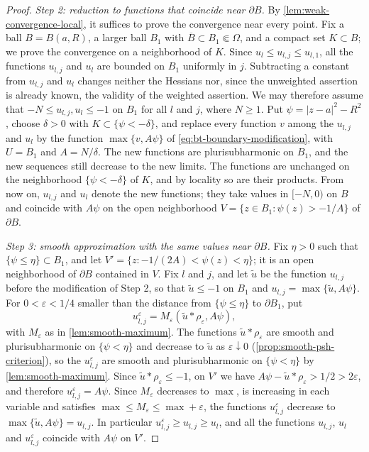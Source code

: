 \begin{proof}
\emph{Step 2: reduction to functions that coincide near $\partial B$.} By \cref{lem:weak-convergence-local}, it suffices to prove the convergence near every point. Fix a ball $B=B(a,R)$, a larger ball $B_1$ with $\overline B\subset B_1\Subset\Omega$, and a compact set $K\subset B$; we prove the convergence on a neighborhood of $K$. Since $u_l\le u_{l,j}\le u_{l,1}$, all the functions $u_{l,j}$ and $u_l$ are bounded on $B_1$ uniformly in $j$. Subtracting a constant from $u_{l,j}$ and $u_l$ changes neither the Hessians nor, since the unweighted assertion is already known, the validity of the weighted assertion. We may therefore assume that $-N\le u_{l,j},u_l\le-1$ on $B_1$ for all $l$ and $j$, where $N\ge1$. Put $\psi=|z-a|^2-R^2$, choose $\delta>0$ with $K\subset\{\psi<-\delta\}$, and replace every function $v$ among the $u_{l,j}$ and $u_l$ by the function $\max\{v,A\psi\}$ of \eqref{eq:bt-boundary-modification}, with $U=B_1$ and $A=N/\delta$. The new functions are plurisubharmonic on $B_1$, and the new sequences still decrease to the new limits. The functions are unchanged on the neighborhood $\{\psi<-\delta\}$ of $K$, and by locality so are their products. From now on, $u_{l,j}$ and $u_l$ denote the new functions; they take values in $[-N,0)$ on $B$ and coincide with $A\psi$ on the open neighborhood $V=\{z\in B_1:\psi(z)>-1/A\}$ of $\partial B$.

\emph{Step 3: smooth approximation with the same values near $\partial B$.} Fix $\eta>0$ such that $\{\psi\le\eta\}\subset B_1$, and let $V'=\{z:-1/(2A)<\psi(z)<\eta\}$; it is an open neighborhood of $\partial B$ contained in $V$. Fix $l$ and $j$, and let $\tilde u$ be the function $u_{l,j}$ before the modification of Step 2, so that $\tilde u\le-1$ on $B_1$ and $u_{l,j}=\max\{\tilde u,A\psi\}$. For $0<\varepsilon<1/4$ smaller than the distance from $\{\psi\le\eta\}$ to $\partial B_1$, put
\[
 u^\varepsilon_{l,j}=M_\varepsilon(\tilde u*\rho_\varepsilon,A\psi),
\]
with $M_\varepsilon$ as in \cref{lem:smooth-maximum}. The functions $\tilde u*\rho_\varepsilon$ are smooth and plurisubharmonic on $\{\psi<\eta\}$ and decrease to $\tilde u$ as $\varepsilon\downarrow0$ (\cref{prop:smooth-psh-criterion}), so the $u^\varepsilon_{l,j}$ are smooth and plurisubharmonic on $\{\psi<\eta\}$ by \cref{lem:smooth-maximum}. Since $\tilde u*\rho_\varepsilon\le-1$, on $V'$ we have $A\psi-\tilde u*\rho_\varepsilon>1/2>2\varepsilon$, and therefore $u^\varepsilon_{l,j}=A\psi$. Since $M_\varepsilon$ decreases to $\max$, is increasing in each variable and satisfies $\max\le M_\varepsilon\le\max+\varepsilon$, the functions $u^\varepsilon_{l,j}$ decrease to $\max\{\tilde u,A\psi\}=u_{l,j}$. In particular $u^\varepsilon_{l,j}\ge u_{l,j}\ge u_l$, and all the functions $u_{l,j}$, $u_l$ and $u^\varepsilon_{l,j}$ coincide with $A\psi$ on $V'$.


\end{proof}
